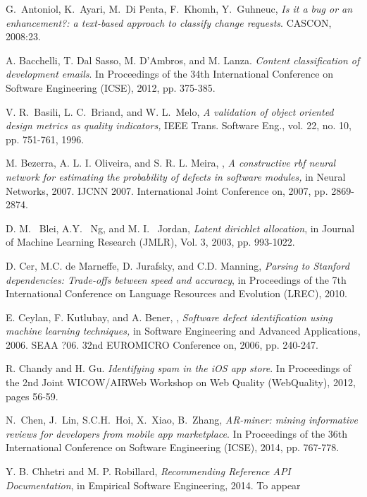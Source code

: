 \documentclass[conference]{IEEEtran}
\begin{document}
     
\begin{thebibliography}{1}

G.~Antoniol, K.~Ayari, M.~Di Penta, F.~Khomh, Y.~Guhneuc, \emph{Is it a bug or an enhancement?: a text-based approach to classify change requests}. CASCON, 2008:23.

A. Bacchelli, T. Dal Sasso, M. D'Ambros, and M. Lanza. \emph{Content classification of development emails}. In Proceedings of the 34th International Conference on Software Engineering (ICSE), 2012, pp. 375-385. 

V. R.~Basili, L. C.~Briand, and W. L.~Melo, \emph{A validation of object oriented design metrics as quality indicators,} IEEE Trans. Software Eng., vol. 22, no. 10, pp. 751-761, 1996. 

M. Bezerra, A. L. I. Oliveira, and S. R. L. Meira, , \emph{A constructive rbf neural network for estimating the probability of defects in software modules,} in Neural Networks, 2007. IJCNN 2007. International Joint Conference on, 2007, pp. 2869-2874. 

D. M. ~Blei, A.Y. ~Ng, and M. I. ~Jordan, \emph{Latent dirichlet allocation}, in Journal of Machine Learning Research (JMLR), Vol. 3, 2003, pp. 993-1022.

D. Cer, M.C. de Marneffe, D. Jurafsky, and C.D. Manning, \emph{Parsing to Stanford dependencies: Trade-offs between speed and accuracy}, in Proceedings of the 7th International Conference on Language Resources and Evolution (LREC), 2010.

E. Ceylan, F. Kutlubay, and A. Bener, , \emph{Software defect identification using machine learning techniques,} in Software Engineering and Advanced Applications, 2006. SEAA ?06. 32nd EUROMICRO Conference on, 2006, pp. 240-247. 

R. Chandy and H. Gu. \emph{Identifying spam in the iOS app store}. In Proceedings of the 2nd Joint WICOW/AIRWeb Workshop on Web Quality (WebQuality), 2012, pages 56-59.

N.~Chen, J.~Lin, S.C.H.~Hoi, X.~Xiao, B.~Zhang, \emph{AR-miner: mining informative reviews for developers from mobile app marketplace}. In Proceedings of the 36th International Conference on Software Engineering (ICSE), 2014, pp. 767-778. 

Y. B. Chhetri and M. P. Robillard, \emph{Recommending Reference API Documentation}, in Empirical Software Engineering, 2014. To appear


\end{thebibliography}
\end{document}
